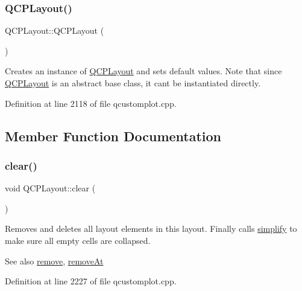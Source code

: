 \subsubsection{\texorpdfstring{Q\+C\+P\+Layout()}{QCPLayout()}}
{\footnotesize\ttfamily Q\+C\+P\+Layout\+::\+Q\+C\+P\+Layout (\begin{DoxyParamCaption}{ }\end{DoxyParamCaption})\hspace{0.3cm}{\ttfamily [explicit]}}

Creates an instance of \hyperlink{class_q_c_p_layout}{Q\+C\+P\+Layout} and sets default values. Note that since \hyperlink{class_q_c_p_layout}{Q\+C\+P\+Layout} is an abstract base class, it can\textquotesingle{}t be instantiated directly. 

Definition at line 2118 of file qcustomplot.\+cpp.



\subsection{Member Function Documentation}
\mbox{\label{class_q_c_p_layout_a02883bdf2769b5b227f0232dba1ac4ee}} 
\subsubsection{\texorpdfstring{clear()}{clear()}}
{\footnotesize\ttfamily void Q\+C\+P\+Layout\+::clear (\begin{DoxyParamCaption}{ }\end{DoxyParamCaption})}

Removes and deletes all layout elements in this layout. Finally calls \hyperlink{class_q_c_p_layout_a41e6ac049143866e8f8b4964efab01b2}{simplify} to make sure all empty cells are collapsed.

\begin{DoxySeeAlso}{See also}
\hyperlink{class_q_c_p_layout_a6c58f537d8086f352576ab7c5b15d0bc}{remove}, \hyperlink{class_q_c_p_layout_a2403f684fee3ce47132faaeed00bb066}{remove\+At} 
\end{DoxySeeAlso}


Definition at line 2227 of file qcustomplot.\+cpp.

\mbox{\label{class_q_c_p_layout_afa73ca7d859f8a3ee5c73c9b353d2a56}} 
